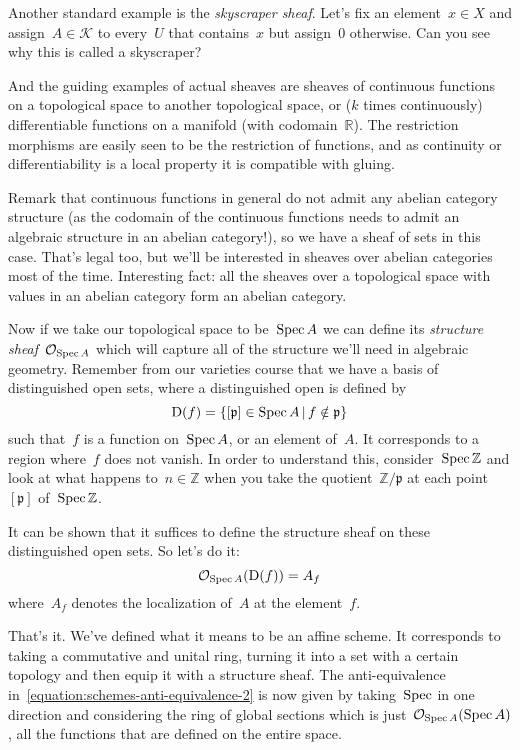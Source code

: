 \begin{example}
  Another standard example is the \emph{skyscraper sheaf}. Let's fix an element~$x\in X$ and assign~$A\in\mathcal{K}$ to every~$U$ that contains~$x$ but assign~$0$ otherwise. Can you see why this is called a skyscraper?
\end{example}

\begin{example}
  And the guiding examples of actual sheaves are sheaves of continuous functions on a topological space to another topological space, or ($k$ times continuously) differentiable functions on a manifold (with codomain~$\mathbb{R}$). The restriction morphisms are easily seen to be the restriction of functions, and as continuity or differentiability is a local property it is compatible with gluing.
  
  Remark that continuous functions in general do not admit any abelian category structure (as the codomain of the continuous functions needs to admit an algebraic structure in an abelian category!), so we have a sheaf of sets in this case. That's legal too, but we'll be interested in sheaves over abelian categories most of the time. Interesting fact: all the sheaves over a topological space with values in an abelian category form an abelian category.
\end{example}

Now if we take our topological space to be~$\operatorname{Spec} A$ we can define its \emph{structure sheaf}~$\mathcal{O}_{\operatorname{Spec} A}$ which will capture all of the structure we'll need in algebraic geometry. Remember from our varieties course that we have a basis of distinguished open sets, where a distinguished open is defined by
\begin{equation}
  \operatorname{D}(f)=\left\{ [\mathfrak{p}]\in\operatorname{Spec} A\,|\,f\notin\mathfrak{p} \right\}
\end{equation}
such that~$f$ is a function on~$\operatorname{Spec} A$, or an element of~$A$. It corresponds to a region where~$f$ does not vanish. In order to understand this, consider~$\operatorname{Spec}\mathbb{Z}$ and look at what happens to~$n\in\mathbb{Z}$ when you take the quotient~$\mathbb{Z}/\mathfrak{p}$ at each point~$[\mathfrak{p}]$ of~$\operatorname{Spec}\mathbb{Z}$.

It can be shown that it suffices to define the structure sheaf on these distinguished open sets. So let's do it:
\begin{equation}
  \mathcal{O}_{\operatorname{Spec} A}(\operatorname{D}(f))=A_f
\end{equation}
where~$A_f$ denotes the localization of~$A$ at the element~$f$.

That's it. We've defined what it means to be an affine scheme. It corresponds to taking a commutative and unital ring, turning it into a set with a certain topology and then equip it with a structure sheaf. The anti-equivalence in~\eqref{equation:schemes-anti-equivalence-2} is now given by taking~$\operatorname{Spec}$ in one direction and considering the ring of global sections which is just~$\mathcal{O}_{\operatorname{Spec} A}({\operatorname{Spec} A})$, all the functions that are defined on the entire space.
